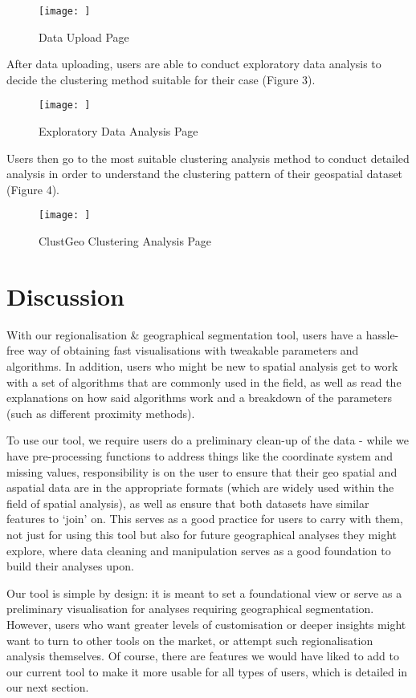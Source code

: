 \documentclass{acm_proc_article-sp}
\begin{document}
\begin{figure}
\centering
\texttt{[image: ]}
\caption{Data Upload Page}
\end{figure}

After data uploading, users are able to conduct exploratory data
analysis to decide the clustering method suitable for their case (Figure
3).

\begin{figure}
\centering
\texttt{[image: ]}
\caption{Exploratory Data Analysis Page}
\end{figure}

Users then go to the most suitable clustering analysis method to conduct
detailed analysis in order to understand the clustering pattern of their
geospatial dataset (Figure 4).

\begin{figure}
\centering
\texttt{[image: ]}
\caption{ClustGeo Clustering Analysis Page}
\end{figure}

\hypertarget{discussion}{%
\section{Discussion}\label{discussion}}

With our regionalisation \& geographical segmentation tool, users have a
hassle-free way of obtaining fast visualisations with tweakable
parameters and algorithms. In addition, users who might be new to
spatial analysis get to work with a set of algorithms that are commonly
used in the field, as well as read the explanations on how said
algorithms work and a breakdown of the parameters (such as different
proximity methods).

To use our tool, we require users do a preliminary clean-up of the data
- while we have pre-processing functions to address things like the
coordinate system and missing values, responsibility is on the user to
ensure that their geo spatial and aspatial data are in the appropriate
formats (which are widely used within the field of spatial analysis), as
well as ensure that both datasets have similar features to `join' on.
This serves as a good practice for users to carry with them, not just
for using this tool but also for future geographical analyses they might
explore, where data cleaning and manipulation serves as a good
foundation to build their analyses upon.

Our tool is simple by design: it is meant to set a foundational view or
serve as a preliminary visualisation for analyses requiring geographical
segmentation. However, users who want greater levels of customisation or
deeper insights might want to turn to other tools on the market, or
attempt such regionalisation analysis themselves. Of course, there are
features we would have liked to add to our current tool to make it more
usable for all types of users, which is detailed in our next section.
\end{document}
